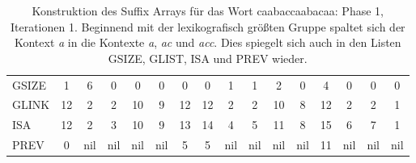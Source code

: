 \begin{table}[H]
\begin{adjustbox}{max width=\textwidth}
\begin{tabular}{lccccccccccccccc}
\multicolumn{1}{l|}{GSIZE}   & \multicolumn{1}{c|}{1}    & \cellcolor[HTML]{\red}6 & 0   & 0   & 0                         & 0                         & \multicolumn{1}{c|}{0}    & \multicolumn{1}{c|}{\cellcolor[HTML]{\red}1}  & \multicolumn{1}{c|}{\cellcolor[HTML]{\red}1}   & 2   & \multicolumn{1}{c|}{0}    & 4                          & 0                          & 0                          & 0                          \\
\multicolumn{1}{l|}{GLINK}   & 12                        & 2                         & 2   & 10  & \cellcolor[HTML]{\red}9 & 12                        & 12                        & 2                                               & 2                                                & 10  & \cellcolor[HTML]{\red}8 & 12                         & 2                          & 2                          & 1                          \\
\multicolumn{1}{l|}{ISA}     & 12                        & 2                         & 3   & 10  & \cellcolor[HTML]{\red}9 & 13                        & 14                        & \cellcolor[HTML]{\red}4                       & \cellcolor[HTML]{\red}5                        & 11  & \cellcolor[HTML]{\red}8 & 15                         & \cellcolor[HTML]{\red}6  & \cellcolor[HTML]{\red}7  & 1                          \\
\multicolumn{1}{l|}{PREV}    & \cellcolor[HTML]{\red}0 & nil                       & nil & nil & nil                       & \cellcolor[HTML]{\red}5 & \cellcolor[HTML]{\red}5 & nil                                             & nil                                              & nil & nil                       & \cellcolor[HTML]{\red}11 & nil                        & nil                        & nil                       
\end{tabular}
\end{adjustbox}

\caption[Konstruktion des Suffix Arrays für das Wort caabaccaabacaa: Phase 1, Iterationen 1]{Konstruktion des Suffix Arrays für das Wort caabaccaabacaa: Phase 1, Iterationen 1. Beginnend mit der lexikografisch größten Gruppe spaltet sich der Kontext \textit{a} in die Kontexte \textit{a}, \textit{ac} und \textit{acc}. Dies spiegelt sich auch in den Listen GSIZE, GLIST, ISA und PREV wieder.}
\label{table_complex_example_1_1} 
\end{table}

